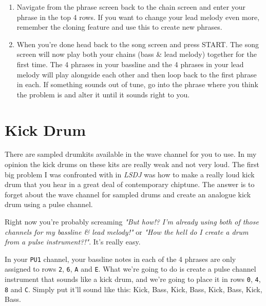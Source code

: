 \documentclass[]{article}
\newcommand{\buttonStyle}[1]{\textsf{#1}\xspace}
\newcommand{\bStart}{\buttonStyle{{START}}}
\newcommand{\gbtxt}[1]{\texttt{#1}\xspace}
\newcommand{\lsdj}{\textit{LSDJ}\xspace}
\begin{document}
\begin{enumerate}[resume]
	
\item Navigate from the phrase screen back to the chain screen and enter your phrase in the top 4 rows. If you want to change your lead melody even more, remember the cloning feature and use this to create new phrases.

\item When you're done head back to the song screen and press \bStart. The song screen will now play both your chains (bass \& lead melody) together for the first time. The 4 phrases in your bassline and the 4 phrases in your lead melody will play alongside each other and then loop back to the first phrase in each. If something sounds out of tune, go into the phrase where you think the problem is and alter it until it sounds right to you.

\end{enumerate}

\section{Kick Drum}

There are sampled drumkits available in the wave channel for you to use. In my opinion the kick drums on these kits are really weak and not very loud. The first big problem I was confronted with in \lsdj was how to make a really loud kick drum that you hear in a great deal of contemporary chiptune.
%
The answer is to forget about the wave channel for sampled drums and create an analogue kick drum using a pulse channel.

Right now you're probably screaming \textit{"But how!? I'm already using both of those channels for my bassline \& lead melody!"} or \textit{"How the hell do I create a drum from a pulse instrument?!"}. It's really easy.

In your \gbtxt{PU1} channel, your bassline notes in each of the 4 phrases are only assigned to rows \gbtxt{2}, \gbtxt{6}, \gbtxt{A} and \gbtxt{E}. What we're going to do is create a pulse channel instrument that sounds like a kick drum, and we're going to place it in rows \gbtxt{0}, \gbtxt{4}, \gbtxt{8} and \gbtxt{C}. Simply put it'll sound like this: Kick, Bass, Kick, Bass, Kick, Bass, Kick, Bass.
\end{document}
